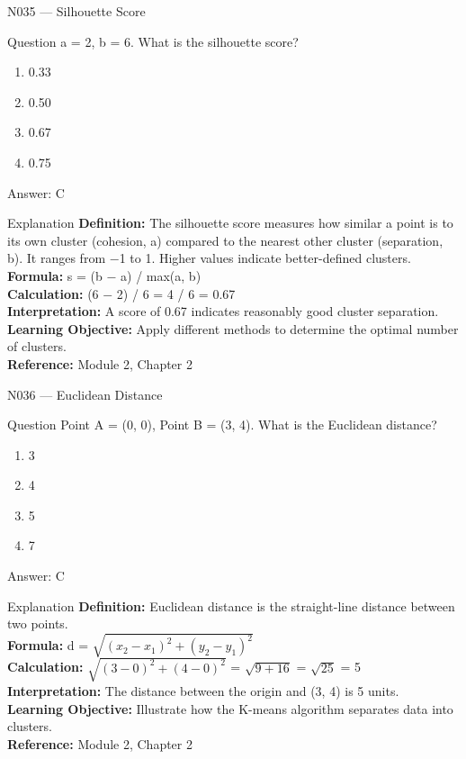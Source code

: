 \documentclass[aspectratio=169,8pt]{beamer}
\begin{document}
	\begin{frame}{N035 --- Silhouette Score}
		\begin{block}{Question}
			a = 2, b = 6. What is the silhouette score?
			\begin{enumerate}
				\item 0.33
				\item 0.50
				\item 0.67
				\item 0.75
			\end{enumerate}
		\end{block}
		\begin{exampleblock}{Answer: C}\end{exampleblock}
		\begin{block}{Explanation}
			\textbf{Definition:} The silhouette score measures how similar a point is to its own cluster (cohesion, a) compared to the nearest other cluster (separation, b). It ranges from $-$1 to 1. Higher values indicate better-defined clusters.\\
			\textbf{Formula:} s = (b $-$ a) / max(a, b)\\
			\textbf{Calculation:} (6 $-$ 2) / 6 = 4 / 6 = 0.67\\
			\textbf{Interpretation:} A score of 0.67 indicates reasonably good cluster separation.\\
			\textbf{Learning Objective:} Apply different methods to determine the optimal number of clusters.\\
			\textbf{Reference:} Module 2, Chapter 2
		\end{block}
	\end{frame}
	
	\begin{frame}{N036 --- Euclidean Distance}
		\begin{block}{Question}
			Point A = (0, 0), Point B = (3, 4). What is the Euclidean distance?
			\begin{enumerate}
				\item 3
				\item 4
				\item 5
				\item 7
			\end{enumerate}
		\end{block}
		\begin{exampleblock}{Answer: C}\end{exampleblock}
		\begin{block}{Explanation}
			\textbf{Definition:} Euclidean distance is the straight-line distance between two points.\\
			\textbf{Formula:} d = $\sqrt{(x_{2}-x_{1})^{2} + (y_{2}-y_{1})^{2}}$\\
			\textbf{Calculation:} $\sqrt{(3-0)^{2} + (4-0)^{2}}$ = $\sqrt{9+16}$ = $\sqrt{25}$ = 5\\
			\textbf{Interpretation:} The distance between the origin and (3, 4) is 5 units.\\
			\textbf{Learning Objective:} Illustrate how the K-means algorithm separates data into clusters.\\
			\textbf{Reference:} Module 2, Chapter 2
		\end{block}
	\end{frame}
	
\end{document}
